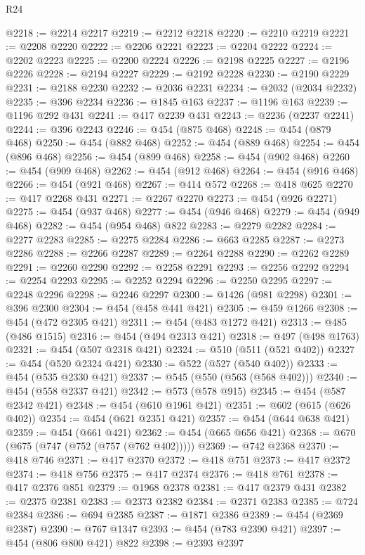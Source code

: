 \begin{lexlean}{R24}
\begin{coremodule}
@2218 := @2214 @2217
@2219 := @2212 @2218
@2220 := @2210 @2219
@2221 := @2208 @2220
@2222 := @2206 @2221
@2223 := @2204 @2222
@2224 := @2202 @2223
@2225 := @2200 @2224
@2226 := @2198 @2225
@2227 := @2196 @2226
@2228 := @2194 @2227
@2229 := @2192 @2228
@2230 := @2190 @2229
@2231 := @2188 @2230
@2232 := @2036 @2231
@2234 := @2032 (@2034 @2232)
@2235 := @396 @2234
@2236 := @1845 @163
@2237 := @1196 @163
@2239 := @1196 @292 @431
@2241 := @417 @2239 @431
@2243 := @2236 (@2237 @2241)
@2244 := @396 @2243
@2246 := @454 (@875 @468)
@2248 := @454 (@879 @468)
@2250 := @454 (@882 @468)
@2252 := @454 (@889 @468)
@2254 := @454 (@896 @468)
@2256 := @454 (@899 @468)
@2258 := @454 (@902 @468)
@2260 := @454 (@909 @468)
@2262 := @454 (@912 @468)
@2264 := @454 (@916 @468)
@2266 := @454 (@921 @468)
@2267 := @414 @572
@2268 := @418 @625
@2270 := @417 @2268 @431
@2271 := @2267 @2270
@2273 := @454 (@926 @2271)
@2275 := @454 (@937 @468)
@2277 := @454 (@946 @468)
@2279 := @454 (@949 @468)
@2282 := @454 (@954 @468) @822
@2283 := @2279 @2282
@2284 := @2277 @2283
@2285 := @2275 @2284
@2286 := @663 @2285
@2287 := @2273 @2286
@2288 := @2266 @2287
@2289 := @2264 @2288
@2290 := @2262 @2289
@2291 := @2260 @2290
@2292 := @2258 @2291
@2293 := @2256 @2292
@2294 := @2254 @2293
@2295 := @2252 @2294
@2296 := @2250 @2295
@2297 := @2248 @2296
@2298 := @2246 @2297
@2300 := @1426 (@981 @2298)
@2301 := @396 @2300
@2304 := @454 (@458 @441 @421)
@2305 := @459 @1266
@2308 := @454 (@472 @2305 @421)
@2311 := @454 (@483 @1272 @421)
@2313 := @485 (@486 @1515)
@2316 := @454 (@494 @2313 @421)
@2318 := @497 (@498 @1763)
@2321 := @454 (@507 @2318 @421)
@2324 := @510 (@511 (@521 @402))
@2327 := @454 (@520 @2324 @421)
@2330 := @522 (@527 (@540 @402))
@2333 := @454 (@535 @2330 @421)
@2337 := @545 (@550 (@563 (@568 @402)))
@2340 := @454 (@558 @2337 @421)
@2342 := @573 (@578 @915)
@2345 := @454 (@587 @2342 @421)
@2348 := @454 (@610 @1961 @421)
@2351 := @602 (@615 (@626 @402))
@2354 := @454 (@621 @2351 @421)
@2357 := @454 (@644 @638 @421)
@2359 := @454 (@661 @421)
@2362 := @454 (@665 @656 @421)
@2368 := @670 (@675 (@747 (@752 (@757 (@762 @402)))))
@2369 := @742 @2368
@2370 := @418 @746
@2371 := @417 @2370
@2372 := @418 @751
@2373 := @417 @2372
@2374 := @418 @756
@2375 := @417 @2374
@2376 := @418 @761
@2378 := @417 @2376 @851
@2379 := @1968 @2378
@2381 := @417 @2379 @431
@2382 := @2375 @2381
@2383 := @2373 @2382
@2384 := @2371 @2383
@2385 := @724 @2384
@2386 := @694 @2385
@2387 := @1871 @2386
@2389 := @454 (@2369 @2387)
@2390 := @767 @1347
@2393 := @454 (@783 @2390 @421)
@2397 := @454 (@806 @800 @421) @822
@2398 := @2393 @2397

\end{coremodule}
\end{lexlean}
